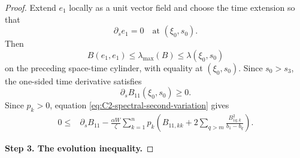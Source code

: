 \documentclass[11pt, reqno]{amsart}
\theoremstyle{remark}
\theoremstyle{definition}
\numberwithin{equation}{section}
\begin{document}
\begin{proof}
Extend $e_1$ locally as a unit vector field and choose the time
extension so that
\begin{equation*}
        \partial_s e_1=0
        \quad\text{at }(\xi_0,s_0).
\end{equation*}
Then
\begin{equation*}
        B(e_1,e_1)
        \leq
        \lambda_{\max}(B)
        \leq
        \lambda(\xi_0,s_0)
\end{equation*}
on the preceding space-time cylinder, with equality at
$(\xi_0,s_0)$. Since $s_0>s_3$, the one-sided time derivative
satisfies
\begin{equation*}
        \partial_sB_{11}(\xi_0,s_0)\geq0.
\end{equation*}
Since $p_k>0$, equation
\eqref{eq:C2-spectral-second-variation} gives
\begin{equation}\label{eq:C2-spectral-max-inequality}
\begin{split}
        0\leq{}&
        \partial_sB_{11}
        -
        \frac{\alpha W}{\zeta}
        \sum_{k=1}^n p_k
        \left(
            B_{11,kk}
            +
            2\sum_{q>m}
            \frac{B_{1q,k}^2}{b_1-b_q}
        \right).
\end{split}
\end{equation}



\medskip
\noindent\textbf{Step 3. The evolution inequality.}


\end{proof}
\end{document}
